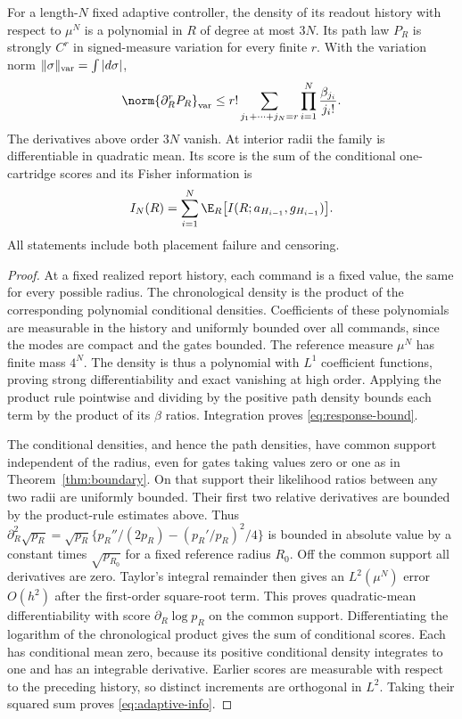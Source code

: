 \begin{theorem}\label{thm:response}
For a length-$N$ fixed adaptive controller, the density of its readout
history with respect to $\mu^N$ is a polynomial in $R$ of degree at most
$3N$. Its path law $P_R$ is strongly $C^r$ in signed-measure variation for
every finite $r$. With the variation norm $\|\sigma\|_{\rm var}=\int|d\sigma|$,
\begin{equation}
 \norm{\partial_R^r P_R}_{\rm var}
 \le r!\sum_{j_1+\cdots+j_N=r}\prod_{i=1}^N\frac{\beta_{j_i}}{j_i!}.
 \label{eq:response-bound}
\end{equation}
The derivatives above order $3N$ vanish. At interior radii the family is
differentiable in quadratic mean. Its score is the sum of the conditional
one-cartridge scores and its Fisher information is
\begin{equation}
 I_N(R)=\sum_{i=1}^N\E_R\bigl[I(R;a_{H_{i-1}},g_{H_{i-1}})\bigr].
 \label{eq:adaptive-info}
\end{equation}
All statements include both placement failure and censoring.
\end{theorem}
\begin{proof}
At a fixed realized report history, each command is a fixed value, the same
for every possible radius. The chronological density is the product of the
corresponding polynomial conditional densities. Coefficients of these
polynomials are measurable in the history and uniformly bounded over all
commands, since the modes are compact and the gates bounded. The reference
measure $\mu^N$ has finite mass $4^N$. The density is thus a polynomial with
$L^1$ coefficient functions, proving strong differentiability and exact
vanishing at high order. Applying the product rule pointwise and dividing
by the positive path density bounds each term by the product of its
$\beta$ ratios. Integration proves \eqref{eq:response-bound}.

The conditional densities, and hence the path densities, have common
support independent of the radius, even for gates taking values zero or one
as in Theorem~\ref{thm:boundary}. On that support their likelihood ratios
between any two radii are uniformly bounded. Their first two relative
derivatives are bounded by the product-rule estimates above. Thus
$\partial_R^2\sqrt{p_R}=\sqrt{p_R}
\{p_R''/(2p_R)-(p_R'/p_R)^2/4\}$ is bounded in absolute value by a
constant times $\sqrt{p_{R_0}}$ for a fixed reference radius $R_0$.
Off the common support all derivatives are zero. Taylor's integral
remainder then gives an $L^2(\mu^N)$ error $O(h^2)$ after the first-order
square-root term. This proves quadratic-mean differentiability with score
$\partial_R\log p_R$ on the common support. Differentiating the logarithm of the chronological
product gives the sum of conditional scores. Each has conditional mean
zero, because its positive conditional density integrates to one and has
an integrable derivative. Earlier scores are measurable with respect to
the preceding history, so distinct increments are orthogonal in $L^2$.
Taking their squared sum proves \eqref{eq:adaptive-info}.
\end{proof}

